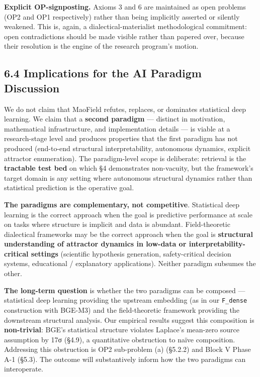 \documentclass[
]{article}
\begin{document}
\textbf{Explicit OP-signposting.} Axioms 3 and 6 are maintained as open
problems (OP2 and OP1 respectively) rather than being implicitly
asserted or silently weakened. This is, again, a dialectical-materialist
methodological commitment: open contradictions should be made visible
rather than papered over, because their resolution is the engine of the
research program's motion.

\hypertarget{implications-for-the-ai-paradigm-discussion}{%
\subsection{6.4 Implications for the AI Paradigm
Discussion}\label{implications-for-the-ai-paradigm-discussion}}

We do not claim that MaoField refutes, replaces, or dominates
statistical deep learning. We claim that a \textbf{second paradigm} ---
distinct in motivation, mathematical infrastructure, and implementation
details --- is viable at a research-stage level and produces properties
that the first paradigm has not produced (end-to-end structural
interpretability, autonomous dynamics, explicit attractor enumeration).
The paradigm-level scope is deliberate: retrieval is the
\textbf{tractable test bed} on which §4 demonstrates non-vacuity, but
the framework's target domain is any setting where autonomous structural
dynamics rather than statistical prediction is the operative goal.

\textbf{The paradigms are complementary, not competitive}. Statistical
deep learning is the correct approach when the goal is predictive
performance at scale on tasks where structure is implicit and data is
abundant. Field-theoretic dialectical frameworks may be the correct
approach when the goal is \textbf{structural understanding of attractor
dynamics in low-data or interpretability-critical settings} (scientific
hypothesis generation, safety-critical decision systems, educational /
explanatory applications). Neither paradigm subsumes the other.

\textbf{The long-term question} is whether the two paradigms can be
composed --- statistical deep learning providing the upstream embedding
(as in our \texttt{F\_dense} construction with BGE-M3) and the
field-theoretic framework providing the downstream structural analysis.
Our empirical results suggest this composition is \textbf{non-trivial}:
BGE's statistical structure violates Laplace's mean-zero source
assumption by 17σ (§4.9), a quantitative obstruction to naïve
composition. Addressing this obstruction is OP2 sub-problem (a) (§5.2.2)
and Block V Phase A-1 (§5.3). The outcome will substantively inform how
the two paradigms can interoperate.
\end{document}
